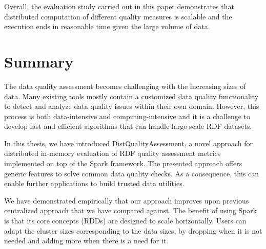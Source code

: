 Overall, the evaluation study carried out in this paper demonstrates that distributed computation of  different quality measures is scalable and the execution ends in reasonable time given the large volume of data.


\section{Summary}
\label{sec:distqualityassesment-summary}
The data quality assessment becomes challenging with the increasing sizes of data.
Many existing tools mostly contain a customized data quality functionality to detect and analyze data quality issues within their own domain. 
However, this process is both data-intensive and computing-intensive and it is a challenge to develop fast and efficient algorithms that can handle large scale \gls{RDF} datasets.

In this thesis, we have introduced DistQualityAssessment, a novel approach for distributed in-memory evaluation of \gls{RDF} quality assessment metrics implemented on top of the Spark framework.
The presented approach offers generic features to solve common data quality checks.
As a consequence, this can enable further applications to build trusted data utilities. 

We have demonstrated empirically that our approach improves upon previous centralized approach that we have compared against.
The benefit of using Spark is that its core concepts (\gls{RDD}s) are designed to scale horizontally. 
Users can adapt the cluster sizes corresponding to the data sizes, by dropping when it is not needed and adding more when there is a need for it.
